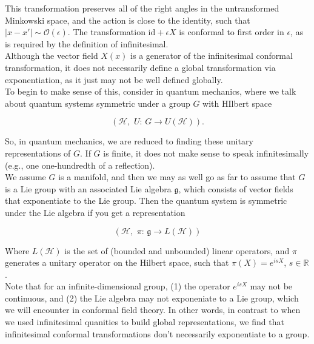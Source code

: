 \noindent This transformation preserves all of the right angles in the untransformed Minkowski space, and the action is close to the identity, such that $|x-x'| \sim \mathcal{O}(\epsilon)$. The transformation $\text{id} + \epsilon X$ is conformal to first order in $\epsilon$, as is required by the definition of infinitesimal. \\

\noindent Although the vector field $X(x)$ is a generator of the infinitesimal conformal transformation, it does not necessarily define a global transformation via exponentiation, as it just may not be well defined globally.\\

\noindent To begin to make sense of this, consider in quantum mechanics, where we talk about quantum systems symmetric under a group $G$ with HIlbert space 

\begin{equation}
(\mathcal{H}, \,\, U: \, G \rightarrow U(\mathcal{H})).
\end{equation}

\noindent So, in quantum mechanics, we are reduced to finding these unitary representations of $G$. If $G$ is finite, it does not make sense to speak infinitesimally (e.g., one one-hundredth of a reflection). \\

\noindent We assume $G$ is a manifold, and then we may as well go as far to assume that $G$ is a Lie group with an associated Lie algebra $\mathfrak{g}$, which consists of vector fields that exponentiate to the Lie group. Then the quantum system is symmetric under the Lie algebra if you get a representation

\begin{equation}
(\mathcal{H}, \, \, \pi: \, \mathfrak{g} \rightarrow L(\mathcal{H}))
\end{equation}

\noindent Where $L(\mathcal{H})$ is the set of (bounded and unbounded) linear operators, and $\pi$ generates a unitary operator on the Hilbert space, such that $\pi(X)= e^{isX}$, $s\in \mathbb{R}$. \\

\noindent Note that for an infinite-dimensional group, (1) the operator $e^{isX}$ may not be continuous, and (2) the Lie algebra may not exponeniate to a Lie group, which we will encounter in conformal field theory. In other words, in contrast to when we used infinitesimal quanities to build global representations, we find that infinitesimal conformal transformations don't necessarily exponentiate to a group.\\

